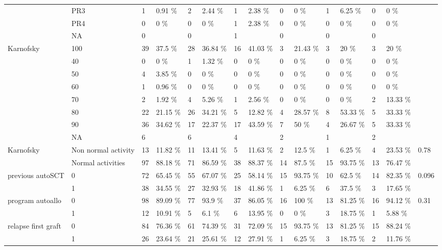 \documentclass[a4paper,11pt] {article}
\begin{document}
\begin{landscape}
\begin{longtable}{lllllllllllllll}
   & PR3 & 1 & 0.91 \% & 2 & 2.44 \% & 1 & 2.38 \% & 0 & 0 \% & 1 & 6.25 \% & 0 & 0 \% &  \\ 
   & PR4 & 0 & 0 \% & 0 & 0 \% & 1 & 2.38 \% & 0 & 0 \% & 0 & 0 \% & 0 & 0 \% &  \\ 
   & NA & 0 &  & 0 &  & 1 &  & 0 &  & 0 &  & 0 &  &  \\ 
  Karnofsky & 100 & 39 & 37.5 \% & 28 & 36.84 \% & 16 & 41.03 \% & 3 & 21.43 \% & 3 & 20 \% & 3 & 20 \% &  \\ 
   & 40 & 0 & 0 \% & 1 & 1.32 \% & 0 & 0 \% & 0 & 0 \% & 0 & 0 \% & 0 & 0 \% &  \\ 
   & 50 & 4 & 3.85 \% & 0 & 0 \% & 0 & 0 \% & 0 & 0 \% & 0 & 0 \% & 0 & 0 \% &  \\ 
   & 60 & 1 & 0.96 \% & 0 & 0 \% & 0 & 0 \% & 0 & 0 \% & 0 & 0 \% & 0 & 0 \% &  \\ 
   & 70 & 2 & 1.92 \% & 4 & 5.26 \% & 1 & 2.56 \% & 0 & 0 \% & 0 & 0 \% & 2 & 13.33 \% &  \\ 
   & 80 & 22 & 21.15 \% & 26 & 34.21 \% & 5 & 12.82 \% & 4 & 28.57 \% & 8 & 53.33 \% & 5 & 33.33 \% &  \\ 
   & 90 & 36 & 34.62 \% & 17 & 22.37 \% & 17 & 43.59 \% & 7 & 50 \% & 4 & 26.67 \% & 5 & 33.33 \% &  \\ 
   & NA & 6 &  & 6 &  & 4 &  & 2 &  & 1 &  & 2 &  &  \\ 
  Karnofsky & Non normal activity & 13 & 11.82 \% & 11 & 13.41 \% & 5 & 11.63 \% & 2 & 12.5 \% & 1 & 6.25 \% & 4 & 23.53 \% & 0.78 \\ 
   & Normal activities & 97 & 88.18 \% & 71 & 86.59 \% & 38 & 88.37 \% & 14 & 87.5 \% & 15 & 93.75 \% & 13 & 76.47 \% &  \\ 
  previous autoSCT & 0 & 72 & 65.45 \% & 55 & 67.07 \% & 25 & 58.14 \% & 15 & 93.75 \% & 10 & 62.5 \% & 14 & 82.35 \% & 0.096 \\ 
   & 1 & 38 & 34.55 \% & 27 & 32.93 \% & 18 & 41.86 \% & 1 & 6.25 \% & 6 & 37.5 \% & 3 & 17.65 \% &  \\ 
  program autoallo & 0 & 98 & 89.09 \% & 77 & 93.9 \% & 37 & 86.05 \% & 16 & 100 \% & 13 & 81.25 \% & 16 & 94.12 \% & 0.31 \\ 
   & 1 & 12 & 10.91 \% & 5 & 6.1 \% & 6 & 13.95 \% & 0 & 0 \% & 3 & 18.75 \% & 1 & 5.88 \% &  \\ 
  relapse first graft & 0 & 84 & 76.36 \% & 61 & 74.39 \% & 31 & 72.09 \% & 15 & 93.75 \% & 13 & 81.25 \% & 15 & 88.24 \% &  \\ 
   & 1 & 26 & 23.64 \% & 21 & 25.61 \% & 12 & 27.91 \% & 1 & 6.25 \% & 3 & 18.75 \% & 2 & 11.76 \% &  \\ 

\end{longtable}
\end{landscape}
\end{document}
